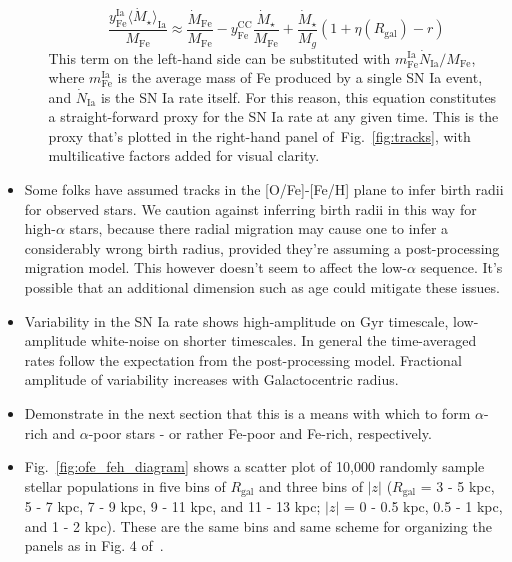 \documentclass[a4paper, fleqn, usenatbib, useAMS]{mnras}
\begin{document}
\begin{itemize}
\begin{itemize}
\begin{equation}
		\frac{
			y_\text{Fe}^\text{Ia}\langle\dot{M}_\star\rangle_\text{Ia}
		}{
			M_\text{Fe} 
		} \approx 
		\frac{\dot{M}_\text{Fe}}{M_\text{Fe}} - y_\text{Fe}^\text{CC}\frac{
			\dot{M}_\star 
		}{
			M_\text{Fe} 
		} + \frac{\dot{M}_\star}{M_g}(1 + \eta(R_\text{gal}) - r) 
		\label{eq:ia_rate_proxy} 
		\end{equation} 
		This term on the left-hand side can be substituted with 
		$m_\text{Fe}^\text{Ia}\dot{N}_\text{Ia}/M_\text{Fe}$, where 
		$m_\text{Fe}^\text{Ia}$ is the average mass of Fe produced by a single 
		SN Ia event, and $\dot{N}_\text{Ia}$ is the SN Ia rate itself. For 
		this reason, this equation constitutes a straight-forward proxy for 
		the SN Ia rate at any given time. This is the proxy that's plotted in 
		the right-hand panel of~Fig.~\ref{fig:tracks}, with multilicative 
		factors added for visual clarity. 
	\end{itemize} 

	\item Some folks have assumed tracks in the [O/Fe]-[Fe/H] plane to infer 
	birth radii for observed stars. We caution against inferring birth radii 
	in this way for high-$\alpha$ stars, because there radial migration may 
	cause one to infer a considerably wrong birth radius, provided they're 
	assuming a post-processing migration model. This however doesn't seem to 
	affect the low-$\alpha$ sequence. It's possible that an additional 
	dimension such as age could mitigate these issues. 

	\item Variability in the SN Ia rate shows high-amplitude on Gyr timescale, 
	low-amplitude white-noise on shorter timescales. In general the 
	time-averaged rates follow the expectation from the post-processing model. 
	Fractional amplitude of variability increases with Galactocentric radius. 

	\item Demonstrate in the next section that this is a means with which to 
	form $\alpha$-rich and $\alpha$-poor stars - or rather Fe-poor and 
	Fe-rich, respectively. 

	\item Fig.~\ref{fig:ofe_feh_diagram} shows a scatter plot of 10,000 
	randomly sample stellar populations in five bins of $R_\text{gal}$ and 
	three bins of $\left|z\right|$ ($R_\text{gal}$ = 3 - 5 kpc, 5 - 7 kpc, 
	7 - 9 kpc, 9 - 11 kpc, and 11 - 13 kpc; $\left|z\right|$ = 0 - 0.5 kpc, 
	0.5 - 1 kpc, and 1 - 2 kpc). These are the same bins and same scheme for 
	organizing the panels as in Fig. 4 of~\citet{Hayden2015}. 


\end{itemize}
\end{document}
